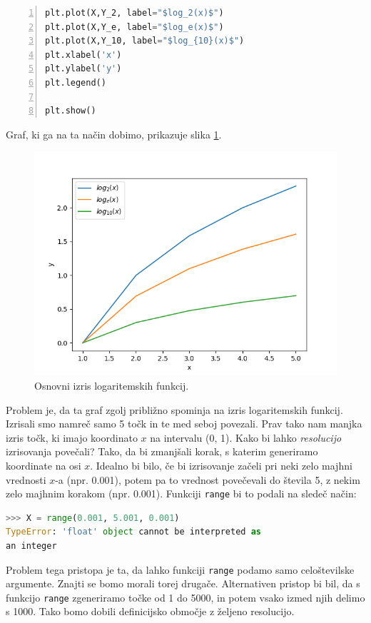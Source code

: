 \begin{resitev}
\begin{lstlisting}[language=Python,numbers=left]
plt.plot(X,Y_2, label="$log_2(x)$")
plt.plot(X,Y_e, label="$log_e(x)$")
plt.plot(X,Y_10, label="$log_{10}(x)$")
plt.xlabel('x')
plt.ylabel('y')
plt.legend()

plt.show()
\end{lstlisting}
Graf, ki ga na ta način dobimo, prikazuje slika \ref{img:plt8}. 
\begin{figure}
    \includegraphics[width=\linewidth]{img/plt8.png}
    \caption{Osnovni izris logaritemskih funkcij.}
    \label{img:plt8}
\end{figure}
Problem je, da ta graf zgolj približno spominja na izris logaritemskih funkcij. Izrisali smo namreč samo 5 točk in te med seboj povezali. Prav tako nam manjka izris točk, ki imajo koordinato $x$ na intervalu (0, 1). Kako bi lahko \emph{resolucijo} izrisovanja povečali? Tako, da bi zmanjšali korak, s katerim generiramo koordinate na osi $x$. Idealno bi bilo, če bi izrisovanje začeli pri neki zelo majhni vrednosti $x$-a (npr. 0.001), potem pa to vrednost povečevali do števila 5, z nekim zelo majhnim korakom (npr. 0.001). Funkciji \texttt{range} bi to podali na sledeč način:
\begin{lstlisting}[language=Python]
>>> X = range(0.001, 5.001, 0.001)
TypeError: 'float' object cannot be interpreted as 
an integer
\end{lstlisting}
Problem tega pristopa je ta, da lahko funkciji \texttt{range} podamo samo celoštevilske argumente. Znajti se bomo morali torej drugače. Alternativen pristop bi bil, da s funkcijo \texttt{range} zgeneriramo točke od 1 do 5000, in potem vsako izmed njih delimo s 1000. Tako bomo dobili definicijsko območje z željeno resolucijo. 

\end{resitev}
